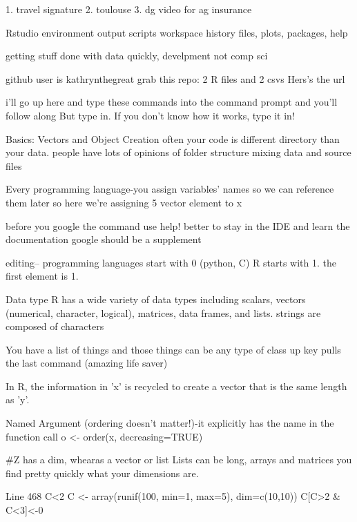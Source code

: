 1. travel signature
2. toulouse
3. dg video for ag insurance


Rstudio environment
output
scripts
workspace
history
files, plots, packages, help

getting stuff done with data quickly, develpment
not comp sci

github user is kathrynthegreat
grab this repo: 2 R files and 2 csvs
Hers's the url

i'll go up here and type these commands into the command prompt and you'll follow along
But type in. If you don't know how it works, type it in!

Basics: Vectors and Object Creation
often your code is different directory than your data. 
people have lots of opinions of folder structure
mixing data and source files


Every programming language-you assign variables' names so we can reference them later
so here we're assigning 5 vector element to x


before you google the command use help! better to stay in the IDE and learn the documentation
google should be a supplement

editing--
programming languages start with 0 (python, C)
R starts with 1. the first element is 1. 


Data type
R has a wide variety of data types including scalars, vectors (numerical, character, logical), matrices, data frames, and lists.
strings are composed of characters

You have  a list of things and those things can be any type of class
up key pulls the last command (amazing life saver)


In R, the information in 'x' is recycled to 
create a vector that is the same length as 'y'.

Named Argument (ordering doesn't matter!)-it explicitly has the name in the function call
 o <- order(x, decreasing=TRUE)
 
 #Z has a dim, whearas a vector or list
 Lists can be long, arrays and matrices you find pretty quickly what your dimensions are. 
 
 Line 468
 C<2
 C <- array(runif(100, min=1, max=5), dim=c(10,10)) 
 C[C>2 & C<3]<-0